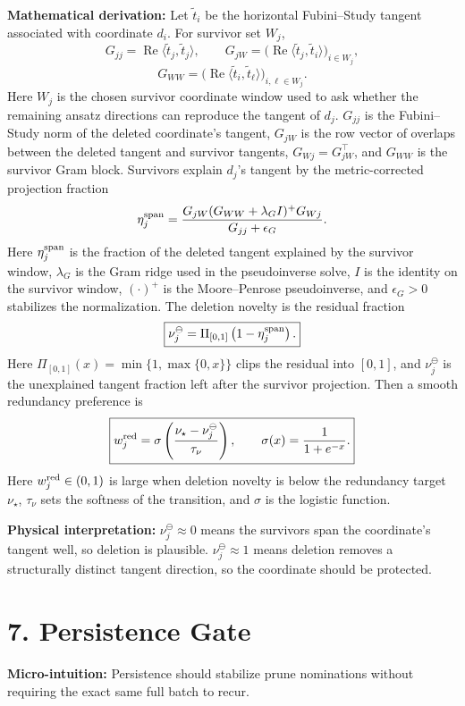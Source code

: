 \documentclass[10pt,twocolumn]{article}
\newcommand{\blk}[1]{\vspace{3pt}\noindent\textbf{#1:}\quad}
\newcommand{\nudel}{\nu_j^{\ominus}}
\newcommand{\clip}{\Pi_{[0,1]}}
\begin{document}
\blk{Mathematical derivation}
Let \(\tilde t_i\) be the horizontal Fubini--Study tangent associated with coordinate \(d_i\). For survivor set \(W_j\),
\[
G_{jj}=\operatorname{Re}\langle \tilde t_j,\tilde t_j\rangle,
\qquad
G_{jW}=
\bigl(\operatorname{Re}\langle \tilde t_j,\tilde t_i\rangle\bigr)_{i\in W_j},
\]
\[
G_{WW}=
\bigl(\operatorname{Re}\langle \tilde t_i,\tilde t_\ell\rangle\bigr)_{i,\ell\in W_j}.
\]
Here \(W_j\) is the chosen survivor coordinate window used to ask whether the remaining ansatz directions can reproduce the tangent of \(d_j\). \(G_{jj}\) is the Fubini--Study norm of the deleted coordinate's tangent, \(G_{jW}\) is the row vector of overlaps between the deleted tangent and survivor tangents, \(G_{Wj}=G_{jW}^{\top}\), and \(G_{WW}\) is the survivor Gram block.
Survivors explain \(d_j\)'s tangent by the metric-corrected projection fraction
\[
\eta_j^{\rm span}
=
\frac{
G_{jW}(G_{WW}+\lambda_G I)^+G_{Wj}
}{
G_{jj}+\epsilon_G
}.
\]
Here \(\eta_j^{\rm span}\) is the fraction of the deleted tangent explained by the survivor window, \(\lambda_G\) is the Gram ridge used in the pseudoinverse solve, \(I\) is the identity on the survivor window, \((\cdot)^+\) is the Moore--Penrose pseudoinverse, and \(\epsilon_G>0\) stabilizes the normalization.
The deletion novelty is the residual fraction
\[
\boxed{
\nudel
=
\clip\left(1-\eta_j^{\rm span}\right).
}
\]
Here \(\clip(x)=\min\{1,\max\{0,x\}\}\) clips the residual into \([0,1]\), and \(\nudel\) is the unexplained tangent fraction left after the survivor projection.
Then a smooth redundancy preference is
\[
\boxed{
w_j^{\rm red}
=
\sigma\left(
\frac{\nu_\star-\nudel}{\tau_\nu}
\right),
\qquad
\sigma(x)=\frac{1}{1+e^{-x}}.
}
\]
Here \(w_j^{\rm red}\in(0,1)\) is large when deletion novelty is below the redundancy target \(\nu_\star\), \(\tau_\nu\) sets the softness of the transition, and \(\sigma\) is the logistic function.

\blk{Physical interpretation}
\(\nudel\approx0\) means the survivors span the coordinate's tangent well, so deletion is plausible. \(\nudel\approx1\) means deletion removes a structurally distinct tangent direction, so the coordinate should be protected.

\section*{7. Persistence Gate}

\blk{Micro-intuition}
Persistence should stabilize prune nominations without requiring the exact same full batch to recur.
\end{document}
